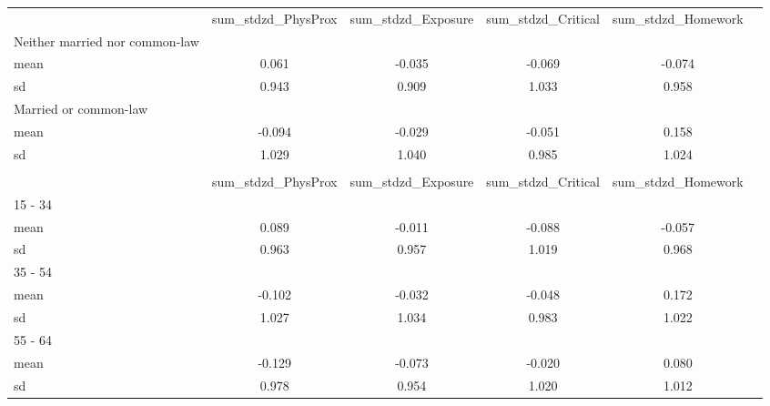 \begin{tabular*}{\hsize}{ @{\extracolsep{\fill}}l*{5}{c}}
\\

                                                  &sum\_stdzd\_PhysProx&sum\_stdzd\_Exposure&sum\_stdzd\_Critical&sum\_stdzd\_Homework\\

\hspace{0.25cm}Neither married nor common-law                    &    &    &    &    \\
mean                                              &0.061&-0.035&-0.069&-0.074\\
sd                                                &0.943&0.909&1.033&0.958\\
\hspace{0.25cm}Married or common-law                             &    &    &    &    \\
mean                                              &-0.094&-0.029&-0.051&0.158\\
sd                                                &1.029&1.040&0.985&1.024\\

\\

                                                  &sum\_stdzd\_PhysProx&sum\_stdzd\_Exposure&sum\_stdzd\_Critical&sum\_stdzd\_Homework\\

\hspace{0.25cm}15 - 34                                           &    &    &    &    \\
mean                                              &0.089&-0.011&-0.088&-0.057\\
sd                                                &0.963&0.957&1.019&0.968\\
\hspace{0.25cm}35 - 54                                           &    &    &    &    \\
mean                                              &-0.102&-0.032&-0.048&0.172\\
sd                                                &1.027&1.034&0.983&1.022\\
\hspace{0.25cm}55 - 64                                           &    &    &    &    \\
mean                                              &-0.129&-0.073&-0.020&0.080\\
sd                                                &0.978&0.954&1.020&1.012\\


\end{tabular*}
